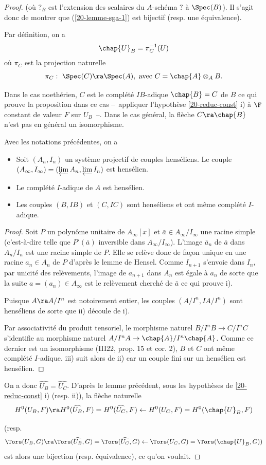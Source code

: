 \documentclass[10pt]{../fichiers-configuration-latex/smfart}
\begin{document}
\begin{proof}
 (où $?_B$ est l'extension des scalaires du $A$-schéma $?$ à $\Spec(B)$).  Il s'agit donc de montrer
que (\ref{20-lemme-sga-1}) est bijectif (resp. une équivalence).

Par définition, on a $$\chap{U}_B=\pi_C^{-1}(U)$$ où $\pi_C$ est la projection naturelle $$\pi_C:\
\Spec(C)\ra\Spec(A),\text{ avec } C=\chap{A}\otimes_AB.$$

Dans le cas noethérien, $C$ est le complété $IB$-adique $\chap{B}=C $ de $B$ ce qui prouve la
proposition dans ce cas -- appliquer l'hypothèse \ref{20-reduc-const} i) à $\F$ constant de valeur
$F$ sur $U_B$ --. Dans le cas général, la flèche $C\ra\chap{B}$ n'est pas en général un
isomorphisme.

\begin{lemme2}\label{20-lemme-hens}Avec les notations précédentes, on a \begin{itemize} \item [i)]
Soit $(A_n,I_n)$ un système projectif de couples henséliens. Le couple
$(A_\infty,I_\infty)=(\varprojlim{A_n},\varprojlim{I_n})$ est hensélien.  \item [ii)] Le complété
$I$-adique de $A$ est hensélien.  \item [iii)] Les couples $(B,IB)$ et $(C,IC)$ sont henséliens et
ont même complété $I$-adique.  \end{itemize} \end{lemme2} \begin{proof} Soit $P$ un polynôme
unitaire de $A_\infty[x]$ et $\bar a\in A_\infty/I_\infty$ une racine simple (c'est-à-dire  telle
que $P'(\bar a)$ inversible dans $A_\infty/I_\infty$). L'image $\bar a_n$ de $\bar a$ dans $A_n/I_n$
est une racine simple de $P$. Elle se relève donc de façon unique en une racine $a_n\in A_n$ de $P$
d'après le lemme de Hensel. Comme $I_{n+1}$ s'envoie dans $I_n$, par unicité des relèvements,
l'image de $a_{n+1}$ dans $A_n$ est égale à $a_n$ de sorte que la suite $a=(a_n)\in A_\infty$ est le
relèvement cherché de $\bar a$ ce qui prouve i).

Puisque $A\ra A/I^n$ est notoirement entier, les couples $(A/I^n, IA/I^n)$ sont henséliens de sorte
que ii) découle de i).


Par associativité du produit tensoriel, le morphisme naturel $B/I^nB\rightarrow C/I^nC$ s'identifie
au morphisme naturel $A/I^nA\rightarrow\chap{A}/I^n\chap{A}$. Comme ce dernier est un isomorphisme
(\ac{III}{2}{2}{, prop. 15 et cor. 2}), $B$ et $C$ ont même complété $I$-adique. iii) suit alors de
ii) car un couple fini sur un hensélien est hensélien.  \end{proof}

On a donc $\widehat{U_B}=\widehat{U_C}$. D'après le lemme précédent, sous les hypothèses de
\ref{20-reduc-const} i) (resp. ii)), la flèche naturelle $$H^0(U_B,F)\ra H^0(\widehat{U_B},F)=
H^0(\widehat{U_C},F)\leftarrow H^0({U_C},F)=H^0(\chap{U}_B,F)$$

(resp. $$\Tors(U_B,G)\ra \Tors(\widehat{U_B},G)= \Tors(\widehat{U_C},G)\leftarrow
\Tors({U_C},G)=\Tors(\chap{U}_B,G))$$ est alors une bijection (resp. équivalence), ce qu'on
voulait.\end{proof}
\end{document}
